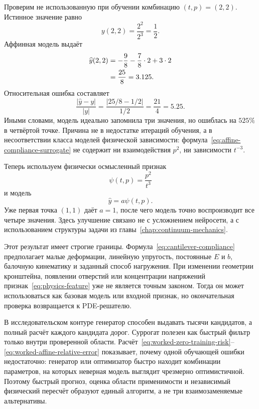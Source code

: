 Проверим не использованную при обучении комбинацию $(t,p)=(2,2)$. Истинное значение равно
\begin{equation}
 y(2,2)
 =
 \frac{2^2}{2^3}
 =
 \frac12.
\end{equation}
Аффинная модель выдаёт
\begin{align}
 \widehat y(2,2)
 &=-\frac98-\frac78\cdot2+3\cdot2
 \notag\\
 &=\frac{25}{8}
 =3.125.
\end{align}
Относительная ошибка составляет
\begin{equation}
\label{eq:worked-affine-relative-error}
 \frac{|\widehat y-y|}{|y|}
 =
 \frac{\left|25/8-1/2\right|}{1/2}
 =
 \frac{21}{4}
 =5.25.
\end{equation}
Иными словами, модель идеально запомнила три значения, но ошиблась на $525\%$ в четвёртой точке. Причина не в недостатке итераций обучения, а в несоответствии класса моделей физической зависимости: формула~\eqref{eq:affine-compliance-surrogate} не содержит ни взаимодействия $p^2$, ни зависимости $t^{-3}$.

Теперь используем физически осмысленный признак
\begin{equation}
\label{eq:physics-feature}
 \psi(t,p)=\frac{p^2}{t^3}
\end{equation}
и модель
\begin{equation}
 \widehat y=a\psi(t,p).
\end{equation}
Уже первая точка $(1,1)$ даёт $a=1$, после чего модель точно воспроизводит все четыре значения. Здесь улучшение связано не с усложнением нейросети, а с использованием структуры задачи из главы~\ref{chap:continuum-mechanics}.

Этот результат имеет строгие границы. Формула~\eqref{eq:cantilever-compliance} предполагает малые деформации, линейную упругость, постоянные $E$ и $b$, балочную кинематику и заданный способ нагружения. При изменении геометрии кронштейна, появлении отверстий или концентрации напряжений признак~\eqref{eq:physics-feature} уже не является точным законом. Тогда он может использоваться как базовая модель или входной признак, но окончательная проверка возвращается к PDE-решателю.

\begin{connection}
В исследовательском контуре генератор способен выдавать тысячи кандидатов, а полный расчёт каждого кандидата дорог. Суррогат полезен как быстрый фильтр только внутри проверенной области. Расчёт~\eqref{eq:worked-zero-training-risk}--\eqref{eq:worked-affine-relative-error} показывает, почему одной обучающей ошибки недостаточно: генератор или оптимизатор быстро находит комбинации параметров, на которых неверная модель выглядит чрезмерно оптимистичной. Поэтому быстрый прогноз, оценка области применимости и независимый физический пересчёт образуют единый алгоритм, а не три взаимозаменяемые альтернативы.
\end{connection}

